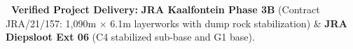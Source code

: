 \vfill

\noindent
\begin{tcolorbox}[enhanced, colback=white, colframe=mhnavy, boxrule=0.8pt, arc=3pt, left=8pt, right=8pt, top=6pt, bottom=6pt, drop shadow=black!3]
    {\fontsize{8pt}{10.6pt}\selectfont\color{mhnavy}\bfseries\faCheckCircle\ Verified Project Delivery:}\quad
    {\fontsize{8pt}{10.6pt}\selectfont\color{mhtext}
    \textbf{JRA Kaalfontein Phase 3B} (Contract JRA/21/157: 1,090m $\times$ 6.1m layerworks with dump rock stabilization) \& \textbf{JRA Diepsloot Ext 06} (C4 stabilized sub-base and G1 base).
    }
\end{tcolorbox}

\clearpage
